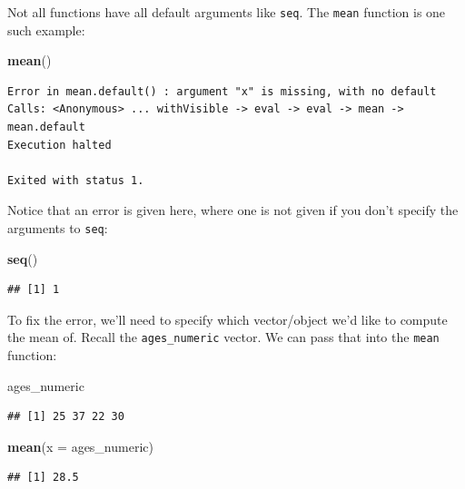\documentclass[]{tufte-book}
\newenvironment{Shaded}{\begin{snugshade}}{\end{snugshade}}
\newcommand{\KeywordTok}[1]{\textcolor[rgb]{0.13,0.29,0.53}{\textbf{{#1}}}}
\newcommand{\DataTypeTok}[1]{\textcolor[rgb]{0.13,0.29,0.53}{{#1}}}
\newcommand{\NormalTok}[1]{{#1}}
\theoremstyle{definition}
\theoremstyle{definition}
\theoremstyle{remark}
\begin{document}
Not all functions have all default arguments like \texttt{seq}. The
\texttt{mean} function is one such example:

\begin{Shaded}
\begin{Highlighting}[]
\KeywordTok{mean}\NormalTok{()}
\end{Highlighting}
\end{Shaded}

\begin{verbatim}
Error in mean.default() : argument "x" is missing, with no default
Calls: <Anonymous> ... withVisible -> eval -> eval -> mean -> mean.default
Execution halted

Exited with status 1.
\end{verbatim}

Notice that an error is given here, where one is not given if you don't
specify the arguments to \texttt{seq}:

\begin{Shaded}
\begin{Highlighting}[]
\KeywordTok{seq}\NormalTok{()}
\end{Highlighting}
\end{Shaded}

\begin{verbatim}
## [1] 1
\end{verbatim}

To fix the error, we'll need to specify which vector/object we'd like to
compute the mean of. Recall the \texttt{ages\_numeric} vector. We can
pass that into the \texttt{mean} function:

\begin{Shaded}
\begin{Highlighting}[]
\NormalTok{ages_numeric}
\end{Highlighting}
\end{Shaded}

\begin{verbatim}
## [1] 25 37 22 30
\end{verbatim}

\begin{Shaded}
\begin{Highlighting}[]
\KeywordTok{mean}\NormalTok{(}\DataTypeTok{x =} \NormalTok{ages_numeric)}
\end{Highlighting}
\end{Shaded}

\begin{verbatim}
## [1] 28.5
\end{verbatim}
\end{document}
